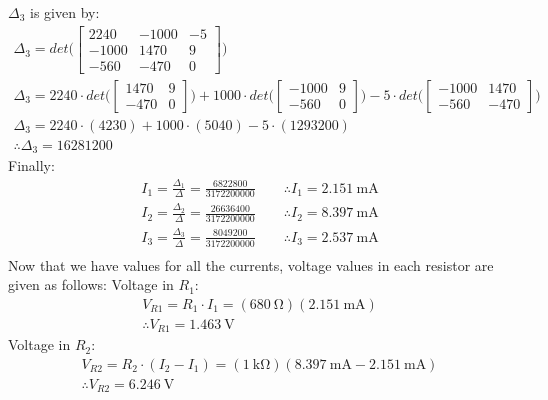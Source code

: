 \documentclass[letterpaper]{article}
\begin{document}
$\Delta_3$ is given by:
    \begin{gather*}
        \Delta_3 = det\Bigg(
        \begin{bmatrix}
            2240 & -1000 & -5\\
            -1000 & 1470 & 9\\
            -560 & -470 & 0
        \end{bmatrix}
        \Bigg)\\
        \Delta_3 = 2240\cdot det\bigg(
        \begin{bmatrix}
            1470 & 9\\
            -470 & 0 
        \end{bmatrix}
        \bigg)
        +1000\cdot det\bigg(
        \begin{bmatrix}
            -1000 & 9\\
            -560 & 0
        \end{bmatrix}
        \bigg)
        -5\cdot det\bigg(
        \begin{bmatrix}
            -1000 & 1470\\
            -560 & -470
        \end{bmatrix}
        \bigg)\\
        \Delta_3 = 2240\cdot(4230)+1000\cdot(5040)-5\cdot(1293200)\\
        \therefore\Delta_3 = 16281200
    \end{gather*}
Finally:
\begin{gather*}
I_1 = \frac{\Delta_1}{\Delta} = \frac{6822800}{3172200000}\qquad\therefore I_1 =
\SI{2.151}{\milli\ampere}\\
I_2 = \frac{\Delta_2}{\Delta} = \frac{26636400}{3172200000}\qquad\therefore I_2 =
\SI{8.397}{\milli\ampere}\\
I_3 = \frac{\Delta_3}{\Delta} = \frac{8049200}{3172200000}\qquad\therefore I_3 =
\SI{2.537}{\milli\ampere}\\
\end{gather*}
Now that we have values for all the currents, voltage values in each resistor are given as follows:
Voltage in $R_1$:
\begin{gather*}V_{R1} = R_1\cdot I_1
    =(\SI{680}{\ohm})(\SI{2.151}{\milli\ampere})\\\therefore V_{R1} =
\SI{1.463}{\volt}
\end{gather*}
Voltage in $R_2$:
\begin{gather*}V_{R2} = R_2\cdot(I_2-I_1)
    =(\SI{1}{\kilo\ohm})(\SI{8.397}{\milli\ampere}-\SI{2.151}{\milli\ampere})\\\therefore V_{R2} =
\SI{6.246}{\volt}
\end{gather*}
\end{document}
